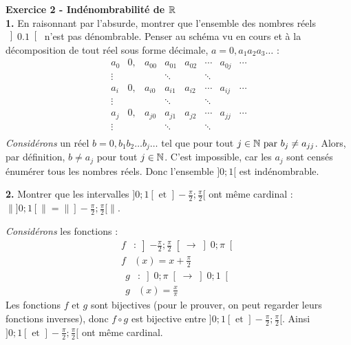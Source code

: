    \hspace*{-2.65cm}\textbf{Exercice 2 - Indénombrabilité de \(\mathbb{R}\)}\\
    \hspace*{-1.5em}\textbf{1.} En raisonnant par l'absurde, montrer que l'ensemble des nombres réels \(\left]0.1\right[\) n'est pas dénombrable. Penser au schéma vu en cours et à la décomposition de tout réel sous forme décimale, \(a=0,a_1a_2a_3\dots\) :
    \[
    \begin{array}{c|ccccccc}
        a_0 &0, &a_{00} &a_{01} &a_{02} &\cdots & a_{0j} & \cdots\\
        \vdots& & & \ddots & & \ddots & & \\
        a_i & 0, &a_{i0} & a_{i1} & a_{i2} & \cdots & a_{ij} & \cdots\\
        \vdots& & & \ddots & & \ddots & & \\
        a_j & 0, &a_{j0} & a_{j1} & a_{j2} & \cdots & a_{jj} & \cdots\\
        \vdots& & & \ddots & & \ddots & & \\
    \end{array}
    \]
    \headrule
    \emph{Considérons} un réel \(b=0,b_1b_2\dots b_j\dots\) tel que pour tout \(j\in\mathbb{N} \text{ par } b_j\neq a_{jj}\). Alors, par définition, \(b\neq a_{j}\) pour tout \(j\in\mathbb{N}\). C'est impossible, car les \(a_j\) sont censés énumérer tous les nombres réels. Donc l'ensemble \(]0;1[\) est indénombrable.

    \hspace*{-1.5em}\textbf{2.} Montrer que les intervalles \(]0;1[\text{ et }]-\frac{\pi}{2};\frac{\pi}{2}[\) ont même cardinal : \(\|]0;1[\|=\|]-\frac{\pi}{2};\frac{\pi}{2}[\|\).\par
    \headrule
    
    \emph{Considérons} les fonctions :
    \begin{equation}
    \begin{split}
        f&\colon\left]-\frac{\pi}{2};\frac{\pi}{2}\right[\rightarrow\left]0;\pi\right[\\
        f&(x)=x+\frac{\pi}{2}
    \end{split}
    \end{equation}
    \begin{equation}
    \begin{split}
        g&\colon\left]0;\pi\right[\rightarrow\left]0;1\right[\\
        g&(x)=\frac{x}{\pi}
    \end{split}
    \end{equation}
    Les fonctions \(f\text{ et }g\) sont bijectives (pour le prouver, on peut regarder leurs fonctions inverses), donc \(f\circ g\) est bijective entre \(]0;1[\text{ et }]-\frac{\pi}{2};\frac{\pi}{2}[\). Ainsi \(]0;1[\text{ et }]-\frac{\pi}{2};\frac{\pi}{2}[\) ont même cardinal.

